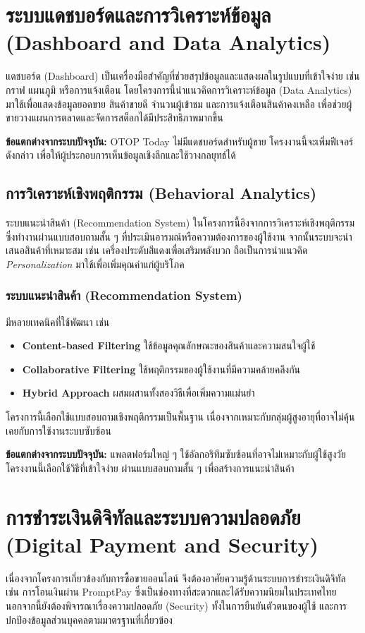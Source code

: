 \section{ระบบแดชบอร์ดและการวิเคราะห์ข้อมูล (Dashboard and Data Analytics)}
แดชบอร์ด (Dashboard) เป็นเครื่องมือสำคัญที่ช่วยสรุปข้อมูลและแสดงผลในรูปแบบที่เข้าใจง่าย \cite{ecommerce2019} 
เช่น กราฟ แผนภูมิ หรือการแจ้งเตือน โดยโครงการนี้นำแนวคิดการวิเคราะห์ข้อมูล (Data Analytics) \cite{otop2020} 
มาใช้เพื่อแสดงข้อมูลยอดขาย สินค้าขายดี จำนวนผู้เข้าชม และการแจ้งเตือนสินค้าคงเหลือ 
เพื่อช่วยผู้ขายวางแผนการตลาดและจัดการสต็อกได้มีประสิทธิภาพมากขึ้น

\textbf{ข้อแตกต่างจากระบบปัจจุบัน:}  
OTOP Today ไม่มีแดชบอร์ดสำหรับผู้ขาย โครงงานนี้จะเพิ่มฟีเจอร์ดังกล่าว 
เพื่อให้ผู้ประกอบการเห็นข้อมูลเชิงลึกและใช้วางกลยุทธ์ได้

\subsection{การวิเคราะห์เชิงพฤติกรรม (Behavioral Analytics)}
ระบบแนะนำสินค้า (Recommendation System) ในโครงการนี้อิงจากการวิเคราะห์เชิงพฤติกรรม \cite{ecommerce2019} 
ซึ่งทำงานผ่านแบบสอบถามสั้น ๆ ที่ประเมินอารมณ์หรือความต้องการของผู้ใช้งาน 
จากนั้นระบบจะนำเสนอสินค้าที่เหมาะสม เช่น เครื่องประดับสีแดงเพื่อเสริมพลังบวก 
ถือเป็นการนำแนวคิด \textit{Personalization} มาใช้เพื่อเพิ่มคุณค่าแก่ผู้บริโภค

\subsubsection{ระบบแนะนำสินค้า (Recommendation System)}
มีหลายเทคนิคที่ใช้พัฒนา เช่น
\begin{itemize}
    \item \textbf{Content-based Filtering} ใช้ข้อมูลคุณลักษณะของสินค้าและความสนใจผู้ใช้
    \item \textbf{Collaborative Filtering} ใช้พฤติกรรมของผู้ใช้งานที่มีความคล้ายคลึงกัน
    \item \textbf{Hybrid Approach} ผสมผสานทั้งสองวิธีเพื่อเพิ่มความแม่นยำ
\end{itemize}
โครงการนี้เลือกใช้แบบสอบถามเชิงพฤติกรรมเป็นพื้นฐาน \cite{ecommerce2019} 
เนื่องจากเหมาะกับกลุ่มผู้สูงอายุที่อาจไม่คุ้นเคยกับการใช้งานระบบซับซ้อน

\textbf{ข้อแตกต่างจากระบบปัจจุบัน:}  
แพลตฟอร์มใหญ่ ๆ ใช้อัลกอริทึมซับซ้อนที่อาจไม่เหมาะกับผู้ใช้สูงวัย 
โครงงานนี้เลือกใช้วิธีที่เข้าใจง่าย ผ่านแบบสอบถามสั้น ๆ เพื่อสร้างการแนะนำสินค้า

\section{การชำระเงินดิจิทัลและระบบความปลอดภัย (Digital Payment and Security)}
เนื่องจากโครงการเกี่ยวข้องกับการซื้อขายออนไลน์ 
จึงต้องอาศัยความรู้ด้านระบบการชำระเงินดิจิทัล เช่น การโอนเงินผ่าน PromptPay \cite{promptpay2021} 
ซึ่งเป็นช่องทางที่สะดวกและได้รับความนิยมในประเทศไทย  
นอกจากนี้ยังต้องพิจารณาเรื่องความปลอดภัย (Security) \cite{pressman2014} 
ทั้งในการยืนยันตัวตนของผู้ใช้ และการปกป้องข้อมูลส่วนบุคคลตามมาตรฐานที่เกี่ยวข้อง


